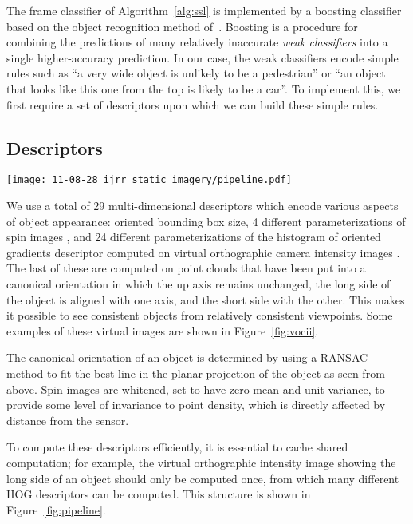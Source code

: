 \documentclass[conference]{IEEEtran}
\begin{document}
The frame classifier \C of Algorithm~\ref{alg:ssl} is implemented by a boosting classifier based on the object recognition method of~\citet{Teichman2011}.  Boosting is a procedure for combining the predictions of many relatively inaccurate \textit{weak classifiers} into a single higher-accuracy prediction. In our case, the weak classifiers encode simple rules such as ``a very wide object is unlikely to be a pedestrian'' or ``an object that looks like this one from the top is likely to be a car''.  To implement this, we first require a set of descriptors upon which we can build these simple rules.

\subsection{Descriptors}

\begin{figure*}
  \centering
  \texttt{[image: 11-08-28\_ijrr\_static\_imagery/pipeline.pdf]}
  \caption{Example pipeline used for efficient descriptor computation.  For clarity, sixteen additional HOG descriptor nodes are not shown.}
  \label{fig:pipeline}
\end{figure*}

We use a total of 29  multi-dimensional descriptors which encode various aspects of object appearance: oriented bounding box size, 4 different parameterizations of spin images \citep{Johnson1999}, and 24 different parameterizations of the histogram of oriented gradients \citep{Dalal2005} descriptor computed on virtual orthographic camera intensity images \citep{Teichman2011}.  The last of these are computed on point clouds that have been put into a canonical orientation in which the up axis remains unchanged, the long side of the object is aligned with one axis, and the short side with the other.  This makes it possible to see consistent objects from relatively consistent viewpoints. Some examples of these virtual images are shown in Figure~\ref{fig:vocii}.

The canonical orientation of an object is determined by using a RANSAC method to fit the best line in the planar projection of the object as seen from above.  Spin images are whitened, \ie set to have zero mean and unit variance, to provide some level of invariance to point density, which is directly affected by distance from the sensor.

To compute these descriptors efficiently, it is essential to cache shared computation; for example, the virtual orthographic intensity image showing the long side of an object should only be computed once, from which many different HOG descriptors can be computed.  This structure is shown in Figure~\ref{fig:pipeline}.
\end{document}

